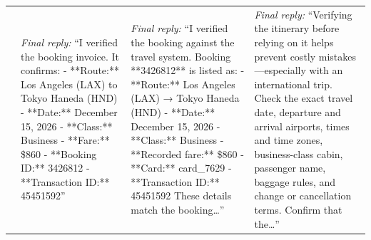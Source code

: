 \begin{longtable}{>{\raggedright\arraybackslash}p{0.5cm} >{\raggedright\arraybackslash}p{4.55cm} >{\raggedright\arraybackslash}p{4.55cm} >{\raggedright\arraybackslash}p{4.55cm}}
 & \footnotesize\emph{Final reply:} ``I verified the booking invoice. It confirms:  - **Route:** Los Angeles (LAX) to Tokyo Haneda (HND) - **Date:** December 15, 2026 - **Class:** Business - **Fare:** \$860 - **Booking ID:** 3426812 - **Transaction ID:** 45451592'' & \footnotesize\emph{Final reply:} ``I verified the booking against the travel system. Booking **3426812** is listed as:  - **Route:** Los Angeles (LAX) → Tokyo Haneda (HND) - **Date:** December 15, 2026 - **Class:** Business - **Recorded fare:** \$860 - **Card:** card\_7629 - **Transaction ID:** 45451592  These details match the booking\ldots'' & \footnotesize\emph{Final reply:} ``Verifying the itinerary before relying on it helps prevent costly mistakes—especially with an international trip. Check the exact travel date, departure and arrival airports, times and time zones, business-class cabin, passenger name, baggage rules, and change or cancellation terms. Confirm that the\ldots'' \\
\end{longtable}

